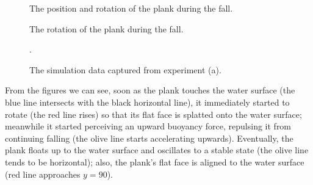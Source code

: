 \begin{figure}[h]
	\centering
	\begin{subcaptionblock}{0.48\textwidth}
		\centering
		\caption{The position and rotation of the plank during the fall.}
		\label{simulation-result-heights}
	\end{subcaptionblock}
	\begin{subcaptionblock}{0.48\textwidth}
		\centering
		\scalebox{0.65}{
			\begin{tikzpicture}
			\end{tikzpicture}
		}
		\caption{The rotation of the plank during the fall.}
		\label{simulation-result-rot}
	\end{subcaptionblock}
	\caption{The simulation data captured from experiment (a).}.
	\label{simulation-result}
\end{figure}

From the figures we can see, soon as the plank touches the water surface (the blue line intersects with the black horizontal line), it immediately started to rotate (the red line rises) so that its flat face is splatted onto the water surface;
meanwhile it started perceiving an upward buoyancy force, repulsing it from continuing falling (the olive line starts accelerating upwards).
Eventually, the plank floats up to the water surface and oscillates to a stable state (the olive line tends to be horizontal);
also, the plank's flat face is aligned to the water surface (red line approaches $y=90$).

